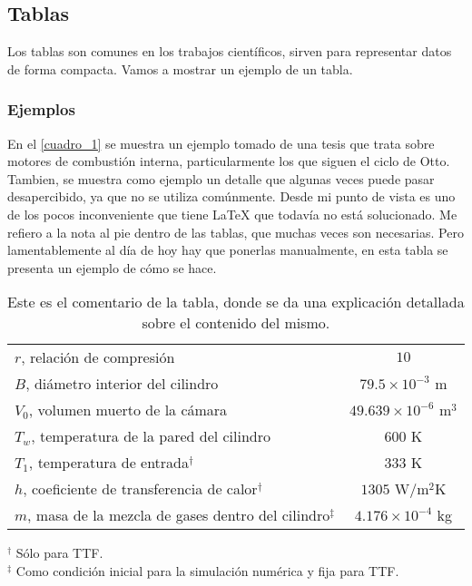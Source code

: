 \documentclass[a4paper,11pt]{article}
\begin{document}
\subsection{Tablas}
Los tablas son comunes en los trabajos científicos, sirven para representar datos de forma compacta. Vamos a mostrar un ejemplo de un tabla.

\subsubsection{Ejemplos}
\label{ej_fonts}
En el \autoref{cuadro_1} se muestra un ejemplo tomado de una tesis que trata sobre motores de combustión interna, particularmente los que siguen el ciclo de Otto. Tambien, se muestra como ejemplo un detalle que algunas veces puede pasar desapercibido, ya que no se utiliza comúnmente. Desde mi punto de vista es uno de los pocos inconveniente que tiene LaTeX que todavía no está solucionado. Me refiero a la nota al pie dentro de las tablas, que muchas veces son necesarias. Pero lamentablemente al día de hoy hay que ponerlas manualmente, en esta tabla se presenta un ejemplo de cómo se hace.

\begin{table}[!ht]
\centering
\caption[Aquí se escribe el comentario que se pone en el índice]{Este es el comentario de la tabla, donde se da una explicación detallada sobre el contenido del mismo.}
\label{cuadro_1}
\medskip 
\begin{tabular}{lc}
\hline \hline
 $r$, relación de compresión & $10$ \\
 $B$, diámetro interior del cilindro &  $79.5 \times 10^{-3}$ m\\
 $V_0$, volumen muerto de la cámara & $49.639 \times 10^{-6}$ m$^3$\\
 $T_w$, temperatura de la pared del cilindro & $600$ K\\
$T_1$, temperatura de entrada$^{\dag}$ & $333$ K\\
 $h$, coeficiente de transferencia de calor$^{\dag}$ & $1305$ W/m$^2$K\\
 $m$, masa de la mezcla de gases dentro del cilindro$^{\ddag}$ & $4.176\times 10^{-4}$ kg \\
\hline \hline
\end{tabular}
\flushleft
\footnotesize
$^{\dag}$ Sólo para TTF.
\\
$^{\ddag}$ Como condición inicial para la simulación numérica y fija para TTF.
\end{table}
\end{document}

